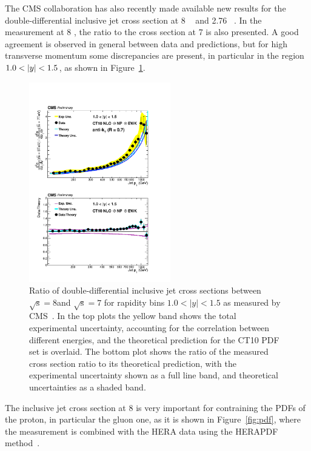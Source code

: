 \documentclass{PoS}
\begin{document}
The CMS collaboration has also recently made available new results for the double-differential inclusive jet cross section at 8
\TeV~\cite{CMS:2015haa} and 2.76 \TeV~\cite{Khachatryan:2015luy}. In the measurement at 8 \TeV, the ratio to the
cross section at 7 \TeV is also presented. A good agreement is observed in general between data and predictions, but for high
transverse momentum some discrepancies are present, in particular in the region $1.0 < \lvert y \rvert < 1.5$, as shown in
Figure~\ref{fig:ratio8to7}.
\begin{figure}[hbpt]
  \centering
  \includegraphics[width=0.55\textwidth]{Figure3.pdf}
  \caption{Ratio of double-differential inclusive jet cross sections
    between $\mathrm{\sqrt{s}=8}$\TeV and $\mathrm{\sqrt{s}=7}$\TeV
    for rapidity bins $1.0 < |y| < 1.5$ as measured by CMS~\cite{Khachatryan:2016wdh}. In the top plots the yellow band shows the total
    experimental uncertainty, accounting for the correlation between
    different energies, and the theoretical prediction for the CT10
    PDF set is overlaid. The bottom plot shows the ratio of the measured
    cross section ratio to its theoretical prediction, with the
    experimental uncertainty shown as a full line band, and
    theoretical uncertainties as a shaded band.}
  \label{fig:ratio8to7}
\end{figure}
The inclusive jet cross section at 8 \TeV is very important for contraining the PDFs of the proton, in particular the gluon
one, as it is shown in Figure~\ref{fig:pdf}, where the measurement is combined with the HERA
data\cite{Abramowicz:2015mha} using the HERAPDF method~\cite{Aaron:2009aa}. 
\end{document}
